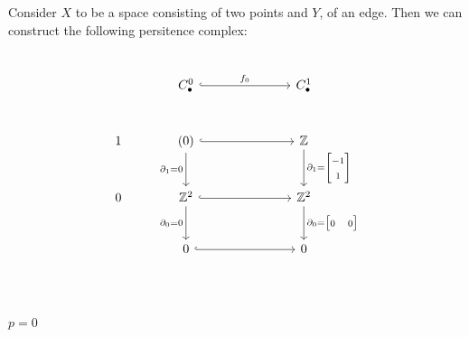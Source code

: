 \documentclass[11pt,a4paper]{report}
\begin{document}
              \begin{Ex} Consider $X$ to be a space consisting of two points and $Y$, of an edge. 
              Then we can construct the following persitence complex: \\ 
        
              \begin{center}
              \end{center}
              \begin{align*}
                \\
                \begin{tikzcd}[ampersand replacement=\&, sep=large]
                  \& C_\bullet^0 \arrow[hookrightarrow]{rr}{f_0} \&\& C_\bullet^1 \\
                  1 \& (0) \arrow[hookrightarrow]{rr} \arrow[d,swap,"\partial_1=0"]          \&\& \mathbb{Z} \arrow[d,"\partial_1={\begin{bmatrix}-1\\1\end{bmatrix}}"]\\
                  0 \& \mathbb{Z}^2 \arrow[hookrightarrow]{rr} \arrow[d,swap,"\partial_0=0"] \&\& \mathbb{Z}^2 \arrow[d,"\partial_0={\begin{bmatrix}0&0\end{bmatrix}}"]\\
                  \& 0 \arrow[hookrightarrow]{rr}              \&\& 0\\
                \end{tikzcd}
              \end{align*}
              \\
              \underline{$p = 0$}

\end{Ex}
\end{document}
